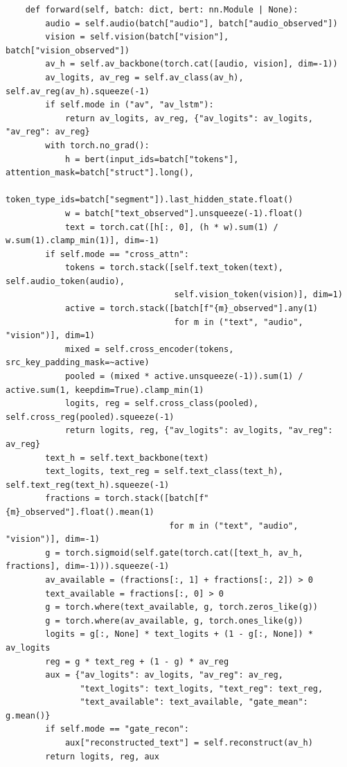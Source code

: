 \begin{lstlisting}
    def forward(self, batch: dict, bert: nn.Module | None):
        audio = self.audio(batch["audio"], batch["audio_observed"])
        vision = self.vision(batch["vision"], batch["vision_observed"])
        av_h = self.av_backbone(torch.cat([audio, vision], dim=-1))
        av_logits, av_reg = self.av_class(av_h), self.av_reg(av_h).squeeze(-1)
        if self.mode in ("av", "av_lstm"):
            return av_logits, av_reg, {"av_logits": av_logits, "av_reg": av_reg}
        with torch.no_grad():
            h = bert(input_ids=batch["tokens"], attention_mask=batch["struct"].long(),
                     token_type_ids=batch["segment"]).last_hidden_state.float()
            w = batch["text_observed"].unsqueeze(-1).float()
            text = torch.cat([h[:, 0], (h * w).sum(1) / w.sum(1).clamp_min(1)], dim=-1)
        if self.mode == "cross_attn":
            tokens = torch.stack([self.text_token(text), self.audio_token(audio),
                                  self.vision_token(vision)], dim=1)
            active = torch.stack([batch[f"{m}_observed"].any(1)
                                  for m in ("text", "audio", "vision")], dim=1)
            mixed = self.cross_encoder(tokens, src_key_padding_mask=~active)
            pooled = (mixed * active.unsqueeze(-1)).sum(1) / active.sum(1, keepdim=True).clamp_min(1)
            logits, reg = self.cross_class(pooled), self.cross_reg(pooled).squeeze(-1)
            return logits, reg, {"av_logits": av_logits, "av_reg": av_reg}
        text_h = self.text_backbone(text)
        text_logits, text_reg = self.text_class(text_h), self.text_reg(text_h).squeeze(-1)
        fractions = torch.stack([batch[f"{m}_observed"].float().mean(1)
                                 for m in ("text", "audio", "vision")], dim=-1)
        g = torch.sigmoid(self.gate(torch.cat([text_h, av_h, fractions], dim=-1))).squeeze(-1)
        av_available = (fractions[:, 1] + fractions[:, 2]) > 0
        text_available = fractions[:, 0] > 0
        g = torch.where(text_available, g, torch.zeros_like(g))
        g = torch.where(av_available, g, torch.ones_like(g))
        logits = g[:, None] * text_logits + (1 - g[:, None]) * av_logits
        reg = g * text_reg + (1 - g) * av_reg
        aux = {"av_logits": av_logits, "av_reg": av_reg,
               "text_logits": text_logits, "text_reg": text_reg,
               "text_available": text_available, "gate_mean": g.mean()}
        if self.mode == "gate_recon":
            aux["reconstructed_text"] = self.reconstruct(av_h)
        return logits, reg, aux
\end{lstlisting}

